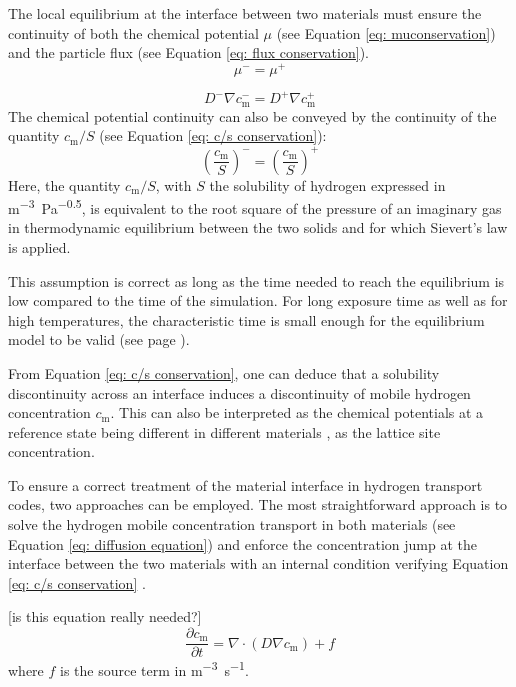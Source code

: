 The local equilibrium at the interface between two materials must ensure  the continuity of both the chemical potential $\mu$ (see Equation \ref{eq: muconservation}) and the particle flux (see Equation \ref{eq: flux conservation}).
\begin{equation}
    \mu^- = \mu^+  \label{eq: muconservation}  
\end{equation}
    
\begin{equation}
    D^- \nabla c_\mathrm{m}^- = D^+ \nabla c_\mathrm{m}^+ \label{eq: flux conservation} 
\end{equation}
The chemical potential continuity can also be conveyed by the continuity of the quantity $c_\mathrm{m}/S$ (see Equation \ref{eq: c/s conservation}):
\begin{equation}
    \left(\frac{c_\mathrm{m}}{S}\right)^- = \left(\frac{c_\mathrm{m}}{S}\right)^+  \label{eq: c/s conservation}  
\end{equation}
Here, the quantity $c_\mathrm{m}/S$, with $S$ the solubility of hydrogen expressed in \si{m^{-3}.Pa^{-0.5}}, is equivalent to the root square of the pressure of an imaginary gas in thermodynamic equilibrium between the two solids and for which Sievert's law is applied.  

This assumption is correct as long as the time needed to reach the equilibrium is low compared to the time of the simulation.
For long exposure time as well as for high temperatures, the characteristic time is small enough for the equilibrium model to be valid (see page ).

From Equation \ref{eq: c/s conservation}, one can deduce that a solubility discontinuity across an interface induces a discontinuity of mobile hydrogen concentration $c_\mathrm{m}$.
This can also be interpreted as the chemical potentials at a reference state being different in different materials , as the lattice site concentration.

To ensure a correct treatment of the material interface in hydrogen transport codes, two approaches can be employed.
The most straightforward approach is to solve the hydrogen mobile concentration transport in both materials (see Equation \ref{eq: diffusion equation}) and enforce the concentration jump at the interface between the two materials with an internal condition verifying  Equation \ref{eq: c/s conservation} .

[is this equation really needed?]
\begin{equation}
    \frac{\partial c_\mathrm{m}}{\partial t}=\nabla \cdot\left(D \nabla c_\mathrm{m}\right) + f
   \label{eq: diffusion equation}
\end{equation}
where $f$ is the source term in \si{m^{-3}.s^{-1}}.

